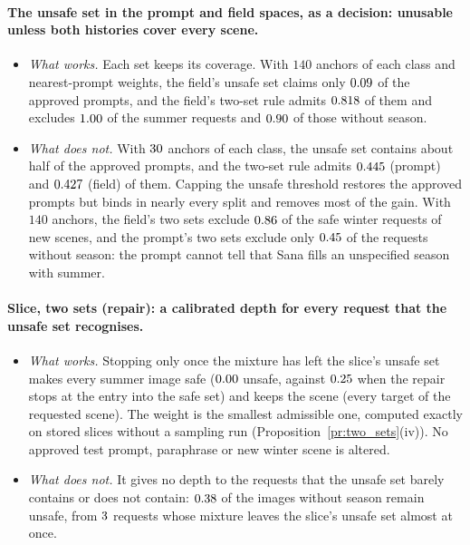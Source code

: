 \documentclass{article}
\theoremstyle{plain}
\theoremstyle{remark}
\begin{document}
\paragraph{The unsafe set in the prompt and field spaces, as a decision: unusable unless both histories cover every scene.}
\begin{itemize}
\item \emph{What works.} Each set keeps its coverage. With $140$ anchors of each class and nearest-prompt weights, the field's unsafe set
claims only $0.09$ of the approved prompts, and the field's two-set rule admits $0.818$ of them and excludes
$1.00$ of the summer requests and $0.90$ of those without season.
\item \emph{What does not.} With $30$ anchors of each class, the unsafe set contains about half of the approved prompts, and the two-set
rule admits $0.445$ (prompt) and $0.427$ (field) of them. Capping the unsafe threshold restores the approved prompts but binds in
nearly every split and removes most of the gain. With $140$ anchors, the field's two sets exclude $0.86$ of the safe winter
requests of new scenes, and the prompt's two sets exclude only $0.45$ of the requests without season: the prompt cannot tell that
Sana fills an unspecified season with summer.
\end{itemize}

\paragraph{Slice, two sets (repair): a calibrated depth for every request that the unsafe set recognises.}
\begin{itemize}
\item \emph{What works.} Stopping only once the mixture has left the slice's unsafe set makes every summer image safe
($0.00$ unsafe, against $0.25$ when the repair stops at the entry into the safe set) and keeps the scene (every
target of the requested scene). The weight is the smallest admissible one, computed exactly on stored slices without a sampling run
(Proposition~\ref{pr:two_sets}(iv)). No approved test prompt, paraphrase or new winter scene is altered.
\item \emph{What does not.} It gives no depth to the requests that the unsafe set barely contains or does not contain: $0.38$
of the images without season remain unsafe, from $3$ requests whose mixture leaves the slice's unsafe set almost at once.
\end{itemize}
\end{document}
